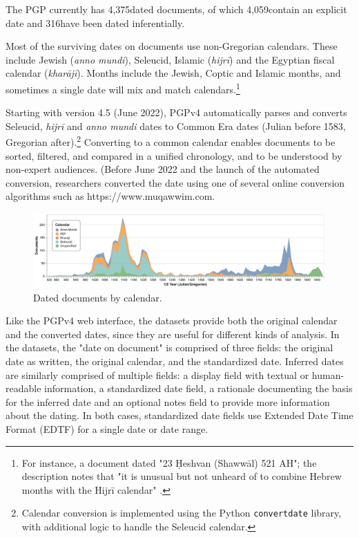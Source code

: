 \documentclass{article}
\def\totalDatedDocs{4,375}
\def\totalDateOnDoc{4,059}
\def\totalInferredDate{316}
\begin{document}
The PGP currently has \totalDatedDocs\space dated documents, of which \totalDateOnDoc\space contain an explicit date and \totalInferredDate\space have been dated inferentially.  

Most of the surviving dates on documents use non-Gregorian calendars. These include Jewish (\textit{anno mundi}),  Seleucid, Islamic (\textit{hijrī}) and the Egyptian fiscal calendar (\textit{kharājī}). Months include the Jewish, Coptic and Islamic months, and sometimes a single date will mix and match calendars.\footnote{For instance, a document dated "23 Ḥeshvan (Shawwāl) 521 AH";  the description notes that "it is unusual but not unheard of to combine Hebrew months with the Hijrī calendar" \autocite{noauthor_legal_1127} .} 

Starting with version 4.5 (June 2022), PGPv4 automatically parses and converts Seleucid, \textit{hijrī} and \textit{anno mundi} dates to Common Era dates (Julian before 1583, Gregorian after).\footnote{Calendar conversion is implemented using the Python \texttt{convertdate} library, with additional logic to handle the Seleucid calendar.} Converting to a common calendar enables documents to be sorted, filtered, and compared in a unified chronology, and to be understood by non-expert audiences. (Before June 2022 and the launch of the automated conversion, researchers converted the date using one of several online conversion algorithms such as https://www.muqawwim.com. 

\begin{figure}[!hbt]
  \centering
  \includegraphics[width=\textwidth]{charts/dated_docs_by_cal.pdf}
  \caption{Dated documents by calendar.}
  \label{fig:docs_dating_combined}
\end{figure}

Like the PGPv4 web interface, the datasets provide both the original calendar and the converted dates, since they are useful for different kinds of analysis. In the datasets, the "date on document" is comprised of three fields: the original date as written, the original calendar, and the standardized date. Inferred dates are similarly comprised of multiple fields: a display field with textual or human-readable information, a standardized date field, a rationale documenting the basis for the inferred date and an optional notes field to provide more information about the dating. In both cases, standardized date fields use Extended Date Time Format (EDTF) for a single date or date range.
\end{document}
